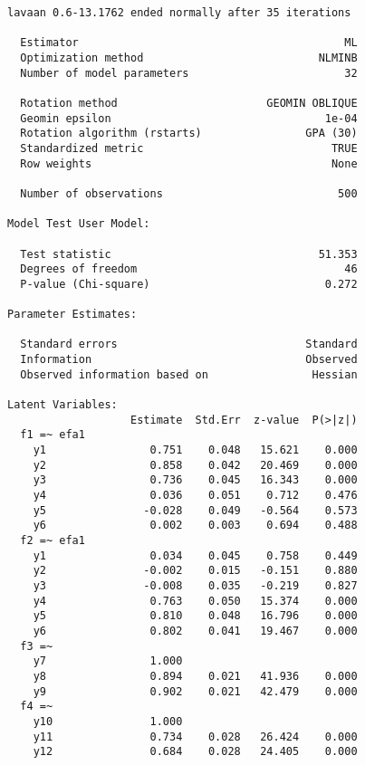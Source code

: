 \begin{verbatim}
lavaan 0.6-13.1762 ended normally after 35 iterations

  Estimator                                         ML
  Optimization method                           NLMINB
  Number of model parameters                        32

  Rotation method                       GEOMIN OBLIQUE
  Geomin epsilon                                 1e-04
  Rotation algorithm (rstarts)                GPA (30)
  Standardized metric                             TRUE
  Row weights                                     None

  Number of observations                           500

Model Test User Model:
                                                      
  Test statistic                                51.353
  Degrees of freedom                                46
  P-value (Chi-square)                           0.272

Parameter Estimates:

  Standard errors                             Standard
  Information                                 Observed
  Observed information based on                Hessian

Latent Variables:
                   Estimate  Std.Err  z-value  P(>|z|)
  f1 =~ efa1                                          
    y1                0.751    0.048   15.621    0.000
    y2                0.858    0.042   20.469    0.000
    y3                0.736    0.045   16.343    0.000
    y4                0.036    0.051    0.712    0.476
    y5               -0.028    0.049   -0.564    0.573
    y6                0.002    0.003    0.694    0.488
  f2 =~ efa1                                          
    y1                0.034    0.045    0.758    0.449
    y2               -0.002    0.015   -0.151    0.880
    y3               -0.008    0.035   -0.219    0.827
    y4                0.763    0.050   15.374    0.000
    y5                0.810    0.048   16.796    0.000
    y6                0.802    0.041   19.467    0.000
  f3 =~                                               
    y7                1.000                           
    y8                0.894    0.021   41.936    0.000
    y9                0.902    0.021   42.479    0.000
  f4 =~                                               
    y10               1.000                           
    y11               0.734    0.028   26.424    0.000
    y12               0.684    0.028   24.405    0.000


\end{verbatim}
